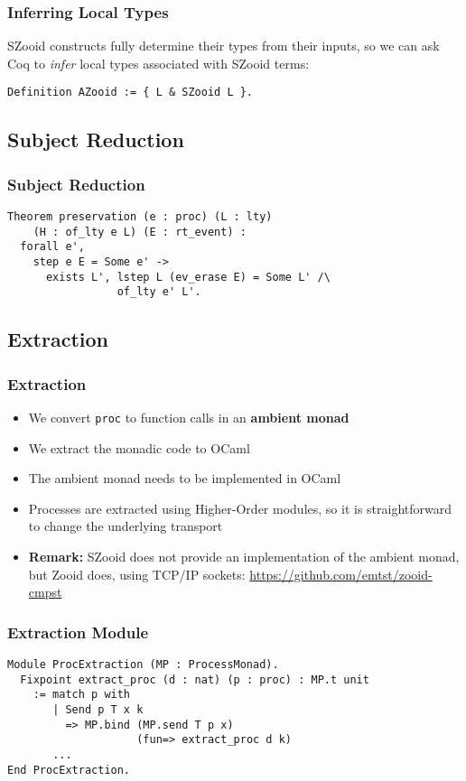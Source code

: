 \begin{frame}[fragile]
    \frametitle{Inferring Local Types}
    SZooid constructs fully determine their types from their inputs, so we can ask Coq to \emph{infer} local types
associated with SZooid terms:
\vspace{1cm}
\begin{verbatim}
Definition AZooid := { L & SZooid L }.
\end{verbatim}
\end{frame}

\subsection{Subject Reduction}

\begin{frame}[fragile]
\frametitle{Subject Reduction}
\begin{verbatim}
Theorem preservation (e : proc) (L : lty) 
    (H : of_lty e L) (E : rt_event) :
  forall e',
    step e E = Some e' ->
      exists L', lstep L (ev_erase E) = Some L' /\
                 of_lty e' L'.
\end{verbatim}
\end{frame}

\subsection{Extraction}

\begin{frame}[fragile]
\frametitle{Extraction}
\begin{itemize}
\item We convert \verb|proc| to function calls in an \textbf{ambient monad}
\item We extract the monadic code to OCaml
\item The ambient monad needs to be implemented in OCaml
\item Processes are extracted using Higher-Order modules, so it is straightforward to change the underlying
transport
\vspace{.2cm}
\item \textbf{Remark:} SZooid does not provide an implementation of the ambient monad, but Zooid does, using TCP/IP sockets: 
\url{https://github.com/emtst/zooid-cmpst}
\end{itemize}
\end{frame}

\begin{frame}[fragile]
\frametitle{Extraction Module}
\begin{verbatim}
Module ProcExtraction (MP : ProcessMonad).
  Fixpoint extract_proc (d : nat) (p : proc) : MP.t unit 
    := match p with
       | Send p T x k
         => MP.bind (MP.send T p x)
                    (fun=> extract_proc d k)
       ...
End ProcExtraction.
\end{verbatim}
\end{frame}

